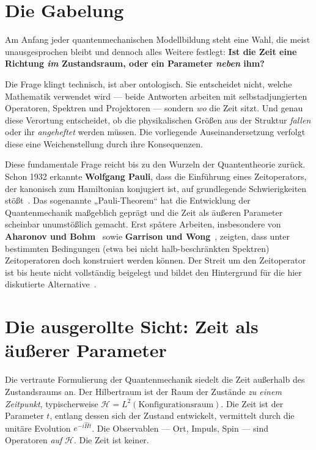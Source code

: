 \documentclass[11pt,a4paper]{article}
\begin{document}
\bigskip

\section{Die Gabelung}

Am Anfang jeder quantenmechanischen Modellbildung steht eine Wahl, die meist unausgesprochen bleibt und dennoch alles Weitere festlegt: \textbf{Ist die Zeit eine Richtung \emph{im} Zustandsraum, oder ein Parameter \emph{neben} ihm?}

Die Frage klingt technisch, ist aber ontologisch. Sie entscheidet nicht, welche Mathematik verwendet wird --- beide Antworten arbeiten mit selbstadjungierten Operatoren, Spektren und Projektoren --- sondern \emph{wo} die Zeit sitzt. Und genau diese Verortung entscheidet, ob die physikalischen Größen aus der Struktur \emph{fallen} oder ihr \emph{angeheftet} werden müssen. Die vorliegende Auseinandersetzung verfolgt diese eine Weichenstellung durch ihre Konsequenzen.

Diese fundamentale Frage reicht bis zu den Wurzeln der Quantentheorie zurück. Schon 1932 erkannte \textbf{Wolfgang Pauli}, dass die Einführung eines Zeitoperators, der kanonisch zum Hamiltonian konjugiert ist, auf grundlegende Schwierigkeiten stößt~\cite{Pauli1933}. Das sogenannte „Pauli-Theorem`` hat die Entwicklung der Quantenmechanik maßgeblich geprägt und die Zeit als äußeren Parameter scheinbar unumstößlich gemacht. Erst spätere Arbeiten, insbesondere von \textbf{Aharonov und Bohm}~\cite{AharonovBohm1961} sowie \textbf{Garrison und Wong}~\cite{GarrisonWong1970}, zeigten, dass unter bestimmten Bedingungen (etwa bei nicht halb-beschränkten Spektren) Zeitoperatoren doch konstruiert werden können. Der Streit um den Zeitoperator ist bis heute nicht vollständig beigelegt und bildet den Hintergrund für die hier diskutierte Alternative~\cite{Muga2008}.

\section{Die ausgerollte Sicht: Zeit als äußerer Parameter}

Die vertraute Formulierung der Quantenmechanik siedelt die Zeit außerhalb des Zustandsraums an. Der Hilbertraum ist der Raum der Zustände \emph{zu einem Zeitpunkt}, typischerweise $\mathcal{H} = L^2(\text{Konfigurationsraum})$. Die Zeit ist der Parameter $t$, entlang dessen sich der Zustand entwickelt, vermittelt durch die unitäre Evolution $e^{-i\hat{H}t}$. Die Observablen --- Ort, Impuls, Spin --- sind Operatoren \emph{auf} $\mathcal{H}$. Die Zeit ist keiner.
\end{document}
